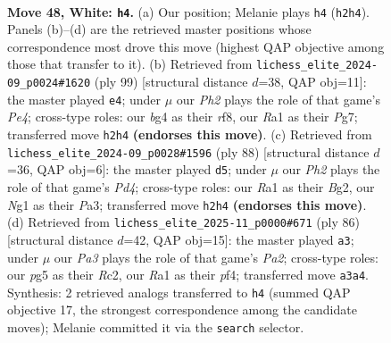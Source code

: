 \documentclass[11pt]{article}
\begin{document}
\clearpage

\begin{figure}[p]\centering
\begin{subfigure}{0.46\textwidth}\centering
\resizebox{\linewidth}{!}{%
\newchessgame
\chessboard[
  setfen={3k2B1/8/7r/6p1/1B3pb1/PP6/1K5P/R5N1 w - - 1 48},
  showmover=false,
  pgfstyle=straightmove, color=movearrow, markmove={h2-h4}
]}
\caption{}
\end{subfigure}\hfill
\begin{subfigure}{0.46\textwidth}\centering
\resizebox{\linewidth}{!}{%
\newchessgame
\chessboard[
  setfen={5R2/1p4p1/2b3k1/3rp2p/8/2B2P2/6PK/8 b - - 1 50},
  showmover=false,
  pgfstyle=straightmove, color=movearrow, markmove={e5-e4}
]}
\caption{}
\end{subfigure}
\\[4pt]
\begin{subfigure}{0.46\textwidth}\centering
\resizebox{\linewidth}{!}{%
\newchessgame
\chessboard[
  setfen={7k/3R4/2P3p1/b6p/2rP4/P5PK/6B1/8 w - - 0 45},
  showmover=false,
  pgfstyle=straightmove, color=movearrow, markmove={d4-d5}
]}
\caption{}
\end{subfigure}\hfill
\begin{subfigure}{0.46\textwidth}\centering
\resizebox{\linewidth}{!}{%
\newchessgame
\chessboard[
  setfen={7r/1b6/3k4/pP6/5p2/7P/P1R2K2/5B2 w - - 6 44},
  showmover=false,
  pgfstyle=straightmove, color=movearrow, markmove={a2-a3}
]}
\caption{}
\end{subfigure}
\caption{\textbf{Move 48, White: \texttt{h4}.} (a) Our position; Melanie plays \texttt{h4} (\texttt{h2h4}). Panels (b)--(d) are the retrieved master positions whose correspondence most drove this move (highest QAP objective among those that transfer to it). (b) Retrieved from \texttt{lichess\_elite\_2024-09\_p0024\#1620} (ply 99) [structural distance $d$=38, QAP obj=11]: the master played \texttt{e4}; under $\mu$ our \emph{Ph2} plays the role of that game's \emph{Pe4}; cross-type roles: our \emph{b}g4 as their \emph{r}f8, our \emph{R}a1 as their \emph{P}g7; transferred move \texttt{h2h4} \textbf{(endorses this move)}. (c) Retrieved from \texttt{lichess\_elite\_2024-09\_p0028\#1596} (ply 88) [structural distance $d$=36, QAP obj=6]: the master played \texttt{d5}; under $\mu$ our \emph{Ph2} plays the role of that game's \emph{Pd4}; cross-type roles: our \emph{R}a1 as their \emph{B}g2, our \emph{N}g1 as their \emph{P}a3; transferred move \texttt{h2h4} \textbf{(endorses this move)}. (d) Retrieved from \texttt{lichess\_elite\_2025-11\_p0000\#671} (ply 86) [structural distance $d$=42, QAP obj=15]: the master played \texttt{a3}; under $\mu$ our \emph{Pa3} plays the role of that game's \emph{Pa2}; cross-type roles: our \emph{p}g5 as their \emph{R}c2, our \emph{R}a1 as their \emph{p}f4; transferred move \texttt{a3a4}. Synthesis: 2 retrieved analogs transferred to \texttt{h4} (summed QAP objective 17, the strongest correspondence among the candidate moves); Melanie committed it via the \texttt{search} selector.}
\label{fig:thought-m94}
\end{figure}
\end{document}
